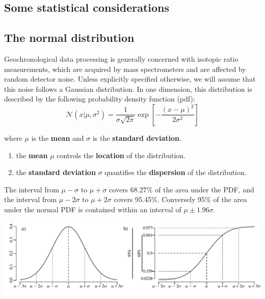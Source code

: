 \begin{refsection}
\chapter{Some statistical considerations}
\label{ch:formats}

\section{The normal distribution}
\label{sec:Gauss}

Geochronological data processing is generally concerned with isotopic
ratio measurements, which are acquired by mass spectrometers and are
affected by random detector noise. Unless explicitly specified
otherwise, we will assume that this noise follows a Gaussian
distribution. In one dimension, this distribution is described by the
following probability density function (pdf):
\begin{equation}
  \mathcal{N}(x|\mu,\sigma^2) = \frac{1}{\sigma\sqrt{2\pi}}
  \exp\!\left[-\frac{(x-\mu)^2}{2\sigma^2}\right]
  \label{eq:gauss}
\end{equation}

\noindent where $\mu$ is the \textbf{mean} and $\sigma$ is the
\textbf{standard deviation}.

\begin{enumerate}
\item the \textbf{mean} $\mu$ controls the \textbf{location} of the
  distribution.
\item the \textbf{standard deviation} $\sigma$ quantifies the
  \textbf{dispersion} of the distribution.
\end{enumerate}

The interval from $\mu-\sigma$ to $\mu+\sigma$ covers 68.27\% of the
area under the PDF, and the interval from $\mu-2\sigma$ to
$\mu+2\sigma$ covers 95.45\%. Conversely 95\% of the area under the
normal PDF is contained within an interval of $\mu\pm{1.96}\sigma$.

\noindent\includegraphics[width=\textwidth]{../figures/2sigma.pdf}
\begingroup {}
\label{fig:2sigma}
\endgroup


\end{refsection}
